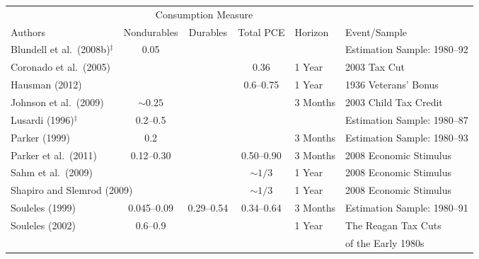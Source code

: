
\begin{center}
\tiny
\begin{tabular}{lcccll}
\toprule
&  \multicolumn{3}{c}{Consumption Measure}&&\\
\cmidrule(r){2-4}
Authors & \multicolumn{1}{c}{Nondurables} & \multicolumn{1}{c}{Durables} & \multicolumn{1}{c}{Total PCE}& Horizon & Event/Sample \\
\midrule
Blundell et al.\ (2008b)$^\ddagger$ & 0.05& &  & & Estimation Sample: 1980--92\\
Coronado et al.\ (2005) & & & \multicolumn{1}{c}{0.36} & 1 Year&2003 Tax Cut\\
Hausman (2012) & & &  \multicolumn{1}{c}{0.6--0.75} & 1 Year & 1936 Veterans' Bonus\\
Johnson et al.\ (2009) & \multicolumn{1}{c}{$\sim0.25$} & & & 3 Months & 2003 Child Tax Credit \\
Lusardi (1996)$^\ddagger$& \multicolumn{1}{c}{0.2--0.5} & & & & Estimation Sample: 1980--87\\
Parker (1999) & 0.2 & & & 3 Months & Estimation Sample: 1980--93\\
Parker et al.\ (2011)& \multicolumn{1}{c}{0.12--0.30} & & \multicolumn{1}{c}{0.50--0.90} & 3 Months &2008 Economic Stimulus \\
Sahm et al.\ (2009)&  & & \multicolumn{1}{c}{$\sim1/3$} & 1 Year &2008 Economic Stimulus \\
\multicolumn{2}{l}{Shapiro and Slemrod (2009)} & & \multicolumn{1}{c}{$\sim1/3$} & 1 Year & 2008 Economic Stimulus \\
Souleles (1999) & \multicolumn{1}{c}{0.045--0.09} & \multicolumn{1}{c}{0.29--0.54} & \multicolumn{1}{c}{0.34--0.64} & 3 Months &Estimation Sample: 1980--91\\
Souleles (2002) & \multicolumn{1}{c}{0.6--0.9} & & & 1 Year &The Reagan Tax Cuts \\
& & & & & of the Early 1980s\\
\bottomrule
\end{tabular}

\end{center} 
